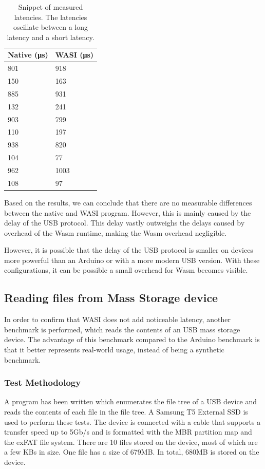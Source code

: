 \begin{table}[h!]
\centering
\begin{tabular}{|l|l|}
\hline
\textbf{Native (μs)} & \textbf{WASI (μs)} \\
\hline
801 & 918 \\
\hline
150 & 163 \\
\hline
885 & 931 \\
\hline
132 & 241 \\
\hline
903 & 799 \\
\hline
110 & 197 \\
\hline
938 & 820 \\
\hline
104 & 77 \\
\hline
962 & 1003 \\
\hline
108 & 97 \\
\hline
\end{tabular}
\caption{Snippet of measured latencies. The latencies oscillate between a long latency and a short latency.}
\label{table:arduino_output}
\end{table}

Based on the results, we can conclude that there are no measurable differences between the native and \acrshort{WASI} program. However, this is mainly caused by the delay of the USB protocol. This delay vastly outweighs the delays caused by overhead of the Wasm runtime, making the Wasm overhead negligible.

However, it is possible that the delay of the USB protocol is smaller on devices more powerful than an Arduino or with a more modern USB version. With these configurations, it can be possible a small overhead for Wasm becomes visible.

\subsection{Reading files from Mass Storage device}
\label{section:mass_storage_latency}

In order to confirm that WASI does not add noticeable latency, another benchmark is performed, which reads the contents of an USB mass storage device. The advantage of this benchmark compared to the Arduino benchmark is that it better represents real-world usage, instead of being a synthetic benchmark.

\subsubsection{Test Methodology}
A program has been written which enumerates the file tree of a USB device and reads the contents of each file in the file tree. A Samsung T5 External SSD is used to perform these tests. The device is connected with a cable that supports a transfer speed up to 5Gb/s and is formatted with the \acrshort{MBR} partition map and the \acrshort{exFAT} file system. There are 10 files stored on the device, most of which are a few KBs in size. One file has a size of 679MB. In total, 680MB is stored on the device.

